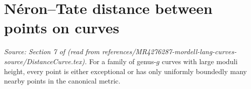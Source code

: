 \section{N\'{e}ron--Tate distance between points on curves}

\begin{proposition}
  \label{prop:alg_pt_far}
  \textit{Source: Section 7 of \cite{MR4276287-mordell-lang-curves} (read from references/MR4276287-mordell-lang-curves-source/DistanceCurve.tex).}
  For a family of genus-\(g\) curves with large moduli height, every point is
  either exceptional or has only uniformly boundedly many nearby points in the
  canonical metric.
\end{proposition}

